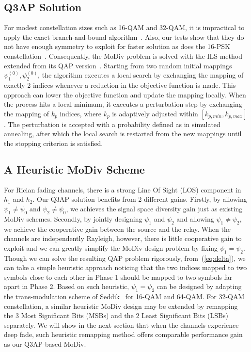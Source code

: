 \documentclass[journal]{IEEEtran}
\begin{document}
\subsection{Q3AP Solution}
For modest constellation sizes such as 16-QAM and 32-QAM, it is impractical
to apply the exact branch-and-bound algorithm~\cite{hahn2008quadratic}. Also,
our tests show that they do not have enough symmetry to exploit for faster
solution as does the 16-PSK constellation~\cite{mittelmann2015solving}.
Consequently, the MoDiv problem is solved with the ILS
method~\cite{hahn2008quadratic} extended from its QAP
version~\cite{stutzle2006iterated}. Starting from two random initial mappings
$\psi_1^{(0)}, \psi_2^{(0)}$, the algorithm executes a local search by
exchanging the mapping of exactly 2 indices whenever a reduction in the
objective function is made. This approach can lower the objective function and
update the mapping locally. When the process hits a local minimum, it executes a
perturbation step by exchanging the mapping of $k_p$ indices, where $k_p$ is
adaptively adjusted within $[k_{p,min}, k_{p,max}]$. The perturbation is
accepted with a probability defined as in simulated annealing, after which the
local search is restarted from the new mappings until the stopping criterion is
satisfied.

\subsection{A Heuristic MoDiv Scheme}
\label{sec:heuristic}
For Rician fading channels, there is a strong Line Of Sight (LOS) component in
$h_1$ and $h_2$. Our Q3AP solution benefits from 2 different gains. Firstly, by
allowing $\psi_1\not=\psi_0$ and $\psi_2\not=\psi_0$, we achieves the signal
space diversity gain just as existing MoDiv schemes. Secondly, by jointly
designing $\psi_1$ and $\psi_2$ and allowing $\psi_1\not=\psi_2$, we achieve the
cooperative gain between the source and the relay. When the channels are
independently Rayleigh, however, there is little cooperative gain to exploit and
we can greatly simplify the MoDiv design problem by fixing $\psi_1=\psi_2$.
Though we can solve the resulting QAP problem rigorously, from~(\ref{eq:delta}),
we can take a simple heuristic approach noticing that the two indices mapped to
two symbols close to each other in Phase 1 should be mapped to two symbols far
apart in Phase 2. Based on such heuristic, $\psi_1=\psi_2$ can be designed by
adapting the trans-modulation scheme of Seddik~\cite{seddik2008trans} for 16-QAM
and 64-QAM. For 32-QAM constellation, a similar heuristic MoDiv design may be
extended by remapping the 3 Most Significant Bits (MSBs) and the 2 Least
Significant Bits (LSBs) separately. We will show in the next section that when
the channels experience deep fade, such heuristic remapping method offers
comparable performance gain as our Q3AP-based MoDiv.
\end{document}

